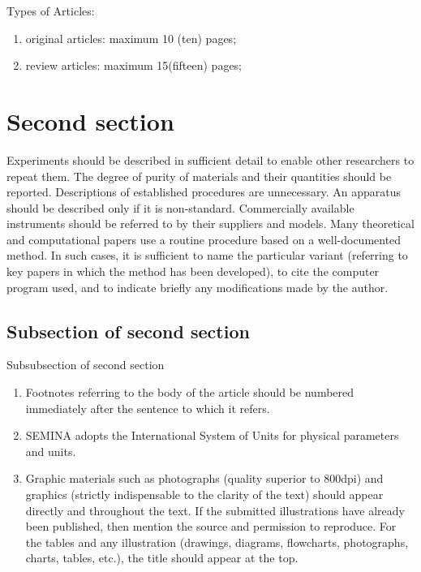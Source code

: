 \documentclass[article,10pt,twoside,a4paper,twocolumn,hidelinks,english,brazil]{abntex2}
\begin{document}
Types of Articles:

\begin{enumerate}
	     \item  original articles: maximum 10 (ten) pages; 
		 \item  review articles: maximum 15(fifteen) pages; 
 \end{enumerate}

    

       
\section*{Second section}

Experiments should be described in sufficient detail to enable other researchers to repeat them. The degree of purity of materials and their quantities should be reported. Descriptions of established procedures are unnecessary. An apparatus should be described only if it is non-standard. Commercially available instruments should be referred to by their suppliers and models. 
Many theoretical and computational papers use a routine procedure based on a well-documented method. In such cases, it is sufficient to name the particular variant (referring to key papers in which the method has been developed), to cite the computer program used, and to indicate briefly any modifications made by the author. 





\subsection*{Subsection of second section }
Subsubsection of second section 

\begin{enumerate}
     \item 	Footnotes referring to the body of the article should be numbered immediately after the sentence to which it refers.
     \item 	SEMINA adopts the International System of Units for physical parameters and units.
     \item 	Graphic materials such as photographs (quality superior to 800dpi) and graphics (strictly indispensable to the clarity of the text) should appear directly and throughout the text. If the submitted illustrations have already been published, then mention the source and permission to reproduce. For the tables and any illustration (drawings, diagrams, flowcharts, photographs, charts, tables, etc.), the title should appear at the top.
\end{enumerate}
\end{document}
